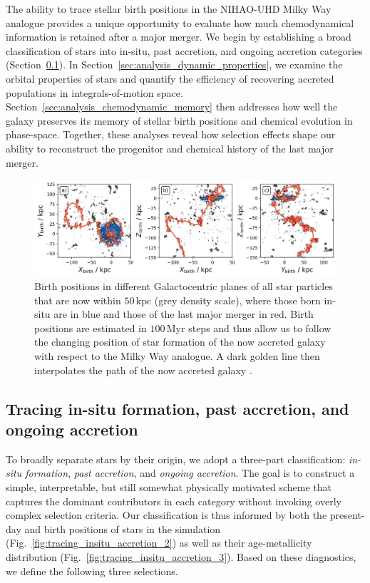 \documentclass[fleqn,usenatbib]{mnras}
\begin{document}
The ability to trace stellar birth positions in the NIHAO-UHD Milky Way analogue provides a unique opportunity to evaluate how much chemodynamical information is retained after a major merger. We begin by establishing a broad classification of stars into in-situ, past accretion, and ongoing accretion categories (Section~\ref{sec:analysis_broad_selection}). In Section~\ref{sec:analysis_dynamic_properties}, we examine the orbital properties of stars and quantify the efficiency of recovering accreted populations in integrals-of-motion space. Section~\ref{sec:analysis_chemodynamic_memory} then addresses how well the galaxy preserves its memory of stellar birth positions and chemical evolution in phase-space. Together, these analyses reveal how selection effects shape our ability to reconstruct the progenitor and chemical history of the last major merger.

\begin{figure}
    \centering
    \includegraphics[width=\textwidth]{figures/tracing_xyz_birth_3.png}
    \caption{Birth positions in different Galactocentric planes of all star particles that are now within $50\,\mathrm{kpc}$ (grey density scale), where those born in-situ are in blue and those of the last major merger in red. Birth positions are estimated in $100\,\mathrm{Myr}$ steps and thus allow us to follow the changing position of star formation of the now accreted galaxy with respect to the Milky Way analogue. A dark golden line then interpolates the path of the now accreted galaxy \href{https://github.com/svenbuder/golden_thread_I/tree/main/figures}{\faGithub}.}
    \label{fig:tracing_xyz_birth_3}
\end{figure}

\subsection{Tracing in-situ formation, past accretion, and ongoing accretion} \label{sec:analysis_broad_selection}

To broadly separate stars by their origin, we adopt a three-part classification: \textit{in-situ formation}, \textit{past accretion}, and \textit{ongoing accretion}. The goal is to construct a simple, interpretable, but still somewhat physically motivated scheme that captures the dominant contributors in each category without invoking overly complex selection criteria. Our classification is thus informed by both the present-day and birth positions of stars in the simulation (Fig.~\ref{fig:tracing_insitu_accretion_2}) as well as their age-metallicity distribution (Fig.~\ref{fig:tracing_insitu_accretion_3}). Based on these diagnostics, we define the following three selections.
\end{document}
